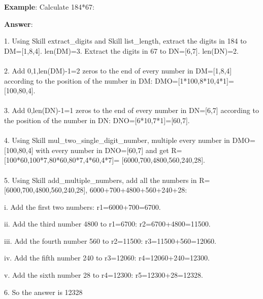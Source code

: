 \documentclass{article} \usepackage{arxiv}
\begin{document}
\newpage


\begin{tcolorbox}[title = {An Example of Skill Composition for Multiplication}, colback = Apricot!25!white, colframe = BrickRed!75!black] 
\textbf{Example}: Calculate 184*67: 

\quad

\textbf{Answer}:

1. Using Skill extract\_digits and Skill list\_length, extract the digits in 184 to DM=[1,8,4].  len(DM)=3. Extract the digits in 67 to DN=[6,7]. len(DN)=2. \\ \\
2. Add 0,1,len(DM)-1=2 zeros to the end of every number in DM=[1,8,4] according to the position of the number in DM: DMO=[1*100,8*10,4*1]=[100,80,4]. \\ \\
3. Add 0,len(DN)-1=1 zeros to the end of every number in DN=[6,7] according to the position of the number in DN: DNO=[6*10,7*1]=[60,7]. \\ \\
4. Using Skill mul\_two\_single\_digit\_number, multiple every number in DMO=[100,80,4] with every number in DNO=[60,7] and get R=[100*60,100*7,80*60,80*7,4*60,4*7]= [6000,700,4800,560,240,28]. \\ \\
5. Using Skill add\_multiple\_numbers, add all the numbers in R=[6000,700,4800,560,240,28], 6000+700+4800+560+240+28:

\quad 

    \qquad i. Add the first two numbers: r1=6000+700=6700. 
    
    \qquad ii. Add the third number 4800 to r1=6700: r2=6700+4800=11500. 
    
    \qquad iii. Add the fourth number 560 to r2=11500: r3=11500+560=12060. 
    
    \qquad iv. Add the fifth number 240 to r3=12060: r4=12060+240=12300. 
    
    \qquad v. Add the sixth number 28 to r4=12300: r5=12300+28=12328. 

\quad
    
6. So the answer is 12328 
\end{tcolorbox}
\noindent\begin{minipage}{\textwidth} 
 \label{Tab:compose_simple_mul_skill}
\end{minipage}
\end{document}

